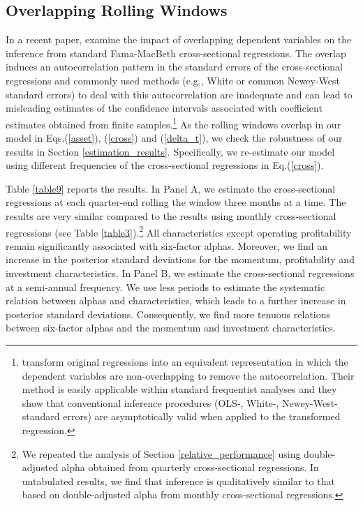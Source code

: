 \subsection{Overlapping Rolling Windows}
In a recent paper, \citet{britten2011improved} examine the impact of overlapping dependent variables on the inference from standard Fama-MacBeth cross-sectional regressions. The overlap induces an autocorrelation pattern in the standard errors of the cross-sectional regressions and commonly used methods (e.g., White or common Newey-West standard errors) to deal with this autocorrelation are inadequate and can lead to misleading estimates of the confidence intervals associated with coefficient estimates obtained from finite samples.\footnote{\citet{britten2011improved} transform original regressions into an equivalent representation in which the dependent variables are non-overlapping to remove the autocorrelation. Their method is easily applicable within standard frequentist analyses and they show that conventional inference procedures (OLS-, White-, Newey-West- standard errors) are asymptotically valid when applied to the transformed regression.} As the rolling windows overlap in our model in Eqs.(\ref{asset}), (\ref{cross}) and (\ref{delta_t}), we check the robustness of our results in Section \ref{estimation_results}.  Specifically, we re-estimate our model using different frequencies of the cross-sectional regressions in Eq.(\ref{cross}).
\par Table \ref{table9} reports the results. In Panel A, we estimate the cross-sectional regressions at each quarter-end rolling the window three months at a time. The results are very similar compared to the results using monthly cross-sectional regressions (see Table \ref{table3}).\footnote{We repeated the analysis of Section \ref{relative_performance} using double-adjusted alpha obtained from quarterly cross-sectional regressions. In untabulated results, we find that inference is qualitatively similar to that based on double-adjusted alpha from monthly cross-sectional regressions.} All characteristics except operating profitability remain significantly associated with six-factor alphas. Moreover, we find an increase in the posterior standard deviations for the momentum, profitability and investment characteristics. In Panel B, we estimate the cross-sectional regressions at a semi-annual frequency. We use less periods to estimate the systematic relation between alphas and characteristics, which leads to a further increase in posterior standard deviations. Consequently, we find more tenuous relations between six-factor alphas and the momentum and investment characteristics.
